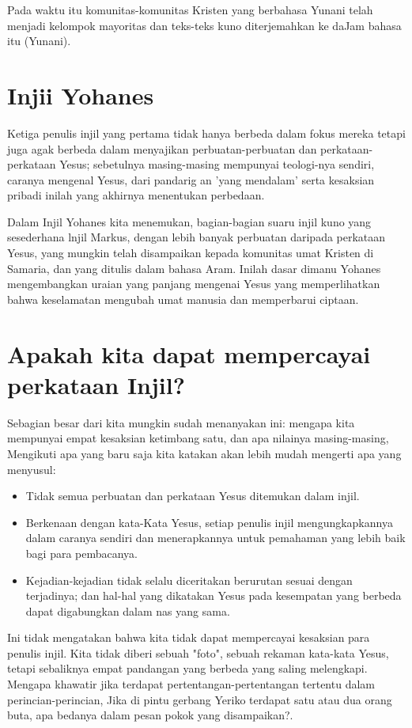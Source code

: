 Pada waktu itu komunitas-komunitas Kristen yang berbahasa Yunani telah menjadi kelompok mayoritas dan teks-teks kuno diterjemahkan ke daJam bahasa itu (Yunani).

\section*{Injii Yohanes}
Ketiga penulis injil yang pertama tidak hanya berbeda dalam fokus mereka tetapi juga agak berbeda dalam menyajikan perbuatan-perbuatan dan perkataan-perkataan Yesus; sebetulnya masing-masing mempunyai teologi-nya sendiri, caranya mengenal Yesus, dari pandarig an 'yang mendalam' serta kesaksian pribadi inilah yang akhirnya menentukan perbedaan.

Dalam Injil Yohanes kita menemukan, bagian-bagian suaru injil kuno yang sesederhana lnjil Markus, dengan lebih banyak perbuatan daripada perkataan Yesus, yang mungkin telah disampaikan kepada komunitas umat Kristen di Samaria, dan yang ditulis dalam bahasa Aram. Inilah dasar dimanu Yohanes mengembangkan uraian yang panjang mengenai Yesus yang memperlihatkan bahwa keselamatan mengubah umat manusia dan memperbarui ciptaan.

\section*{Apakah kita dapat mempercayai perkataan Injil?}
Sebagian besar dari kita mungkin sudah menanyakan ini: mengapa kita mempunyai empat kesaksian ketimbang satu, dan apa nilainya masing-masing, Mengikuti apa yang baru saja kita katakan akan lebih mudah mengerti apa yang menyusul:
\begin{itemize}
\item Tidak semua perbuatan dan perkataan Yesus ditemukan dalam injil.
\item Berkenaan dengan kata-Kata Yesus, setiap penulis injil mengungkapkannya dalam caranya sendiri dan menerapkannya untuk pemahaman yang lebih baik bagi para pembacanya.
\item Kejadian-kejadian tidak selalu diceritakan berurutan sesuai dengan terjadinya; dan hal-hal yang dikatakan Yesus pada kesempatan yang berbeda dapat digabungkan dalam nas yang sama.
\end{itemize}

Ini tidak mengatakan bahwa kita tidak dapat mempercayai kesaksian para penulis injil. Kita tidak diberi sebuah "foto", sebuah rekaman kata-kata Yesus, tetapi sebaliknya empat pandangan yang berbeda yang saling melengkapi. Mengapa khawatir jika terdapat pertentangan-pertentangan tertentu dalam perincian-perincian, Jika di pintu gerbang Yeriko terdapat satu atau dua orang buta, apa bedanya dalam pesan pokok yang disampaikan?.

